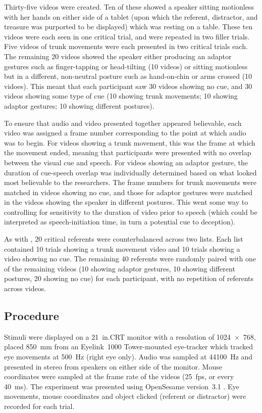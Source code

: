\documentclass[a4paper,man,natbib]{apa6}
\begin{document}
Thirty-five videos were created.
Ten of these showed a speaker sitting motionless with her hands on either side of a tablet (upon which the referent, distractor, and treasure was purported to be displayed) which was resting on a table.
These ten videos were each seen in one critical trial, and were repeated in two filler trials.
Five videos of trunk movements were each presented in two critical trials each.
The remaining 20 videos showed the speaker either producing an adaptor gestures such as finger-tapping or head-tilting (10 videos) or sitting motionless but in a different, non-neutral posture such as hand-on-chin or arms crossed (10 vidoes).
This meant that each participant saw 30 videos showing no cue, and 30 videos showing some type of cue (10 showing trunk movements; 10 showing adaptor gestures; 10 showing different postures).

To ensure that audio and video presented together appeared believable, each video was assigned a frame number corresponding to the point at which audio was to begin.
For videos showing a trunk movement, this was the frame at which the movement ended, meaning that participants were presented with no overlap between the visual cue and speech. 
For videos showing an adaptor gesture, the duration of cue-speech overlap was individually determined based on what looked most believable to the researchers.
The frame numbers for trunk movements were matched in videos showing no cue, and those for adaptor gestures were matched in the videos showing the speaker in different postures.
This went some way to controlling for sensitivity to the duration of video prior to speech (which could be interpreted as speech-initiation time, in turn a potential cue to deception).

As with \citet{Loy2017}, 20 critical referents were counterbalanced across two lists. 
Each list contained 10 trials showing a trunk movement video and 10 trials showing a video showing no cue.
The remaining 40 referents were randomly paired with one of the remaining videos (10 showing adaptor gestures, 10 showing different postures, 20 showing no cue) for each participant, with no repetition of referents across videos.


\subsection{Procedure}
Stimuli were displayed on a 21~in.\@ CRT monitor with a resolution of 1024~$\times$~768, placed 850~mm from an Eyelink~1000 Tower-mounted eye-tracker which tracked eye movements at 500~Hz (right eye only). 
Audio was sampled at 44100~Hz and presented in stereo from speakers on either side of the monitor. 
Mouse coordinates were sampled at the frame rate of the videos (25~fps, or every 40~ms).
The experiment was presented using OpenSesame version~3.1 \citep{Mathot2012}.
Eye movements, mouse coordinates and object clicked (referent or distractor) were recorded for each trial.
\end{document}
